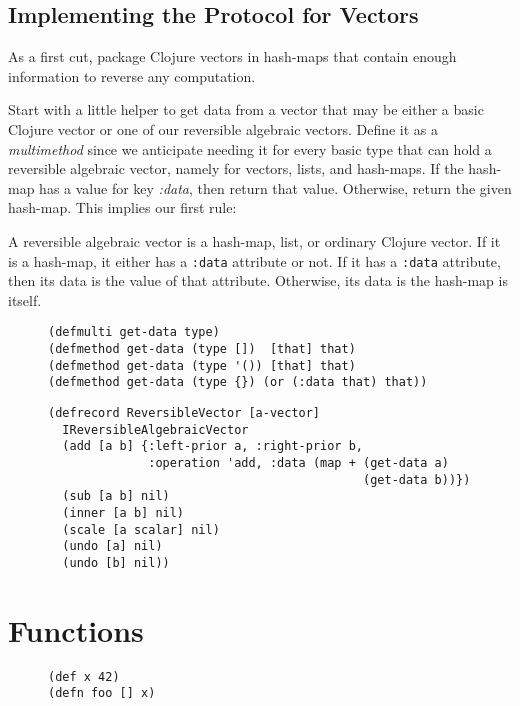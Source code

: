 \documentclass[11pt]{article}
\begin{document}
\subsection{Implementing the Protocol for Vectors}
\label{sec-2-1}

As a first cut, package Clojure vectors in hash-maps that contain enough
information to reverse any computation.

Start with a little helper to get data from a vector that may be either
a basic Clojure vector or one of our reversible algebraic vectors.
Define it as a \emph{multimethod} since we anticipate needing it for every
basic type that can hold a reversible algebraic vector, namely for
vectors, lists, and hash-maps. If the hash-map has a value for key
\emph{:data}, then return that value. Otherwise, return the given
hash-map. This implies our first rule:
\begin{myrule}[Data]
A reversible algebraic vector is a hash-map, list, or ordinary Clojure
vector. If it is a hash-map, it either has a \texttt{:data}
attribute or not.
If it has a \texttt{:data} attribute, then its data is the value of that
attribute. Otherwise, its data is the
hash-map is itself.
\end{myrule}


\begin{figure}[H]
\label{get-data-helper}
\begin{verbatim}
(defmulti get-data type)
(defmethod get-data (type [])  [that] that)
(defmethod get-data (type '()) [that] that)
(defmethod get-data (type {}) (or (:data that) that))
\end{verbatim}
\end{figure}

\begin{figure}[H]
\label{reversible-algebraic-vector-on-vector}
\begin{verbatim}
(defrecord ReversibleVector [a-vector]
  IReversibleAlgebraicVector
  (add [a b] {:left-prior a, :right-prior b,
              :operation 'add, :data (map + (get-data a)
                                            (get-data b))})
  (sub [a b] nil)
  (inner [a b] nil)
  (scale [a scalar] nil)
  (undo [a] nil)
  (undo [b] nil))
\end{verbatim}
\end{figure}

\section{Functions}
\label{sec-3}
\begin{figure}[H]
\label{main-functions}
\begin{verbatim}
(def x 42)
(defn foo [] x)
\end{verbatim}
\end{figure}
\end{document}
